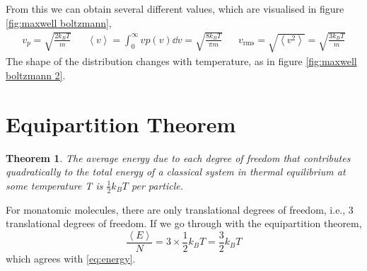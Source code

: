 \documentclass{book}
\newtheorem*{theorem}{Theorem}
\begin{document}
From this we can obtain several different values, which are visualised in figure \ref{fig:maxwell boltzmann},
\begin{align}
	v_p = \sqrt{\frac{2k_BT}{m}} && \left<v\right> = \int_0^{\infty} vp(v) \dd{v} = \sqrt{\frac{8k_BT}{\pi m}} && v_{\text{rms}} = \sqrt{\left<v^2\right>} = \sqrt{\frac{3k_BT}{m}} \label{eq:velocities}
\end{align}
The shape of the distribution changes with temperature, as in figure \ref{fig:maxwell boltzmann 2}.
\section{Equipartition Theorem}
\begin{theorem}
	The average energy due to each degree of freedom that contributes quadratically to the total energy of a classical system in thermal equilibrium at some temperature T is $\frac{1}{2}k_BT$ per particle. 
\end{theorem} \noindent
For monatomic molecules, there are only translational degrees of freedom, i.e., 3 translational degrees of freedom. If we go through with the equipartition theorem, 
\begin{equation}
	\frac{\left<E\right>}{N} = 3 \times \frac{1}{2}k_B T = \frac{3}{2}k_BT
\end{equation}
which agrees with \eqref{eq:energy}.
\end{document}
